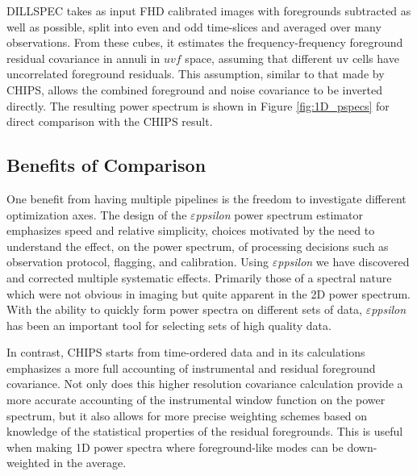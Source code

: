 \documentclass[twolcolumn,iop]{emulateapj}
\def\eppsilon{{\it $\varepsilon$ppsilon}}
\def\empirical{DILLSPEC}
\begin{document}
\empirical{} takes as input FHD calibrated images with foregrounds subtracted as well as possible, split into even and odd time-slices and averaged over many observations. From these cubes, it estimates the frequency-frequency foreground residual covariance in annuli in $uvf$ space, assuming that different uv cells have uncorrelated foreground residuals. This assumption, similar to that made by CHIPS, allows the combined foreground and noise covariance to be inverted directly. The resulting power spectrum is shown in Figure \ref{fig:1D_pspecs} for direct comparison with the CHIPS result. 



\subsection{Benefits of Comparison}
\label{sec:benefits_of_comparison}


One benefit from having multiple pipelines is the freedom to investigate  different optimization axes.  The design of the \eppsilon{} power spectrum estimator emphasizes speed and relative simplicity, choices  motivated by the need to understand the effect, on the power spectrum, of processing decisions such as observation protocol, flagging, and calibration. Using \eppsilon{} we have discovered and corrected multiple systematic effects. Primarily those of a spectral nature which were not obvious in imaging but quite apparent in the 2D power spectrum. With the ability to quickly form power spectra on different sets of data, \eppsilon{} has been an important tool for selecting sets of high quality data. 

In contrast, CHIPS starts from time-ordered data and in its calculations emphasizes a more full accounting of instrumental and residual foreground covariance. Not only does this higher resolution covariance calculation provide a more accurate accounting of the instrumental window function on the power spectrum, but it also allows for more precise weighting schemes based on knowledge of the statistical properties of the residual foregrounds. This is useful when making 1D power spectra where foreground-like modes can be down-weighted in the average. 
\end{document}
